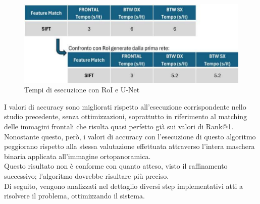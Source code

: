 \documentclass[12pt,a4paper,openright,twoside]{book}
\begin{document}
\begin{itemize}
\begin{figure}[H]
	\label{fig:sx5}
\end{figure}
\begin{figure}[H]
	\centering
	\includegraphics{figures/tempi5_1.pdf}
    	\caption{Tempi di esecuzione con RoI e U-Net}
	\label{fig:tempi5}
\end{figure}
\end{itemize}
I valori di accuracy sono migliorati rispetto all'esecuzione corrispondente nello studio precedente, senza ottimizzazioni, soprattutto in riferimento al matching delle immagini frontali che risulta quasi perfetto già sui valori di Rank@1.\\
Nonostante questo, però, i valori di accuracy con l'esecuzione di questo algoritmo peggiorano rispetto alla stessa valutazione effettuata attraverso l'intera maschera binaria applicata all'immagine ortopanoramica.\\
Questo risultato non è conforme con quanto atteso, visto il raffinamento successivo; l'algoritmo dovrebbe risultare più preciso.\\
Di seguito, vengono analizzati nel dettaglio diversi step implementativi atti a risolvere il problema, ottimizzando il sistema.
\end{document}
